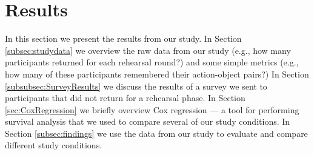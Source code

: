 \section{Results} \label{sec:Results}
In this section we present the results from our study. In Section \ref{subsec:studydata} we overview the raw data from our study (e.g., how many participants returned for each rehearsal round?) and some simple metrics (e.g., how many of these participants remembered their action-object pairs?)
In Section \ref{subsubsec:SurveyResults} we discuss the results of a survey we sent to participants that did not return for a rehearsal phase.
In Section \ref{sec:CoxRegression} we briefly overview Cox regression --- a tool for performing survival analysis that we used to compare several of our study conditions. In Section \ref{subsec:findings} we use the data from our study to evaluate and compare different study conditions.


